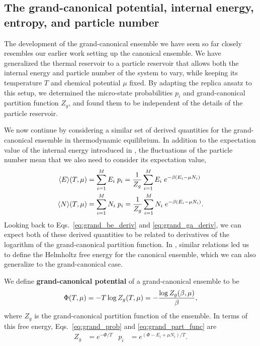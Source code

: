 \subsection{The grand-canonical potential, internal energy, entropy, and particle number}
The development of the grand-canonical ensemble we have seen so far closely resembles our earlier work setting up the canonical ensemble.
We have generalized the thermal reservoir to a particle reservoir that allows both the internal energy and particle number of the system \Om to vary, while keeping its temperature $T$ and chemical potential $\mu$ fixed.
By adapting the replica ansatz to this setup, we determined the micro-state probabilities $p_i$ and grand-canonical partition function $Z_g$, and found them to be independent of the details of the particle reservoir.

We now continue by considering a similar set of derived quantities for the grand-canonical ensemble in thermodynamic equilibrium.
In addition to the expectation value of the internal energy introduced in , the fluctuations of the particle number mean that we also need to consider its expectation value,
\begin{align*}
  \left\langle E \right\rangle\!(T, \mu) & = \sum_{i = 1}^M E_i \; p_i = \frac{1}{Z_g} \sum_{i = 1}^M E_i \; e^{-\beta (E_i - \mu N_i)} \\
  \left\langle N \right\rangle\!(T, \mu) & = \sum_{i = 1}^M N_i \; p_i = \frac{1}{Z_g} \sum_{i = 1}^M N_i \; e^{-\beta (E_i - \mu N_i)}.
\end{align*}
Looking back to Eqs.~\ref{eq:grand_be_deriv} and \ref{eq:grand_ga_deriv}, we can expect both of these derived quantities to be related to derivatives of the logarithm of the grand-canonical partition function.
In , similar relations led us to define the Helmholtz free energy for the canonical ensemble, which we can also generalize to the grand-canonical case.

\begin{shaded}
  We define \textbf{grand-canonical potential} of a grand-canonical ensemble to be
  \begin{equation}
    \label{eq:grand_pot}
    \Phi(T, \mu) = -T \log Z_g(T, \mu) = -\frac{\log Z_g(\beta, \mu)}{\beta},
  \end{equation}
  where $Z_g$ is the grand-canonical partition function of the ensemble.
  In terms of this free energy, Eqs.~\ref{eq:grand_prob} and \ref{eq:grand_part_func} are
  \begin{align*}
    Z_g & = e^{-\Phi / T} &
    p_i & = e^{(\Phi - E_i + \mu N_i) / T}.
  \end{align*}
\end{shaded}

